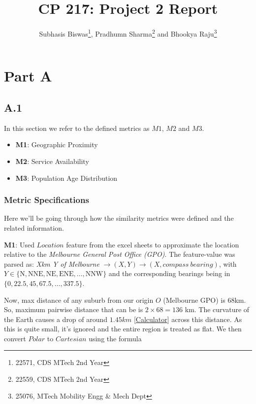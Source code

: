\documentclass[
	a4paper, %
	10pt, %
	unnumberedsections, %
	twoside, %
]{LTJournalArticle}
\title{CP 217: Project 2 Report} %
\author{%
	Subhasis Biswas\thanks{22571, CDS MTech 2nd Year},  Pradhumn Sharma\thanks{22559, CDS MTech 2nd Year} and Bhookya Raju\thanks{25076, MTech Mobility Engg \& Mech Dept}
}
\begin{document}





\section{Part A}



\subsection{A.1}

In this section we refer to the defined metrics as $M1$, $M2$ and $M3$.
\begin{itemize}
    \item \textbf{M1}: Geographic Proximity
    \item \textbf{M2}: Service Availability
    \item \textbf{M3}: Population Age Distribution
\end{itemize}

\subsubsection{Metric Specifications}\leavevmode


Here we'll be going through how the similarity metrics were defined and the related information.

\textbf{M1}: Used $Location$ feature from the excel sheets to approximate the location relative to the \textit{Melbourne General Post Office (GPO)}. The feature-value was parsed as: \newline
\textit{Xkm Y of Melbourne} $\rightarrow (X, Y) \rightarrow (X, compass\ bearing)$, with $Y \in \{\text{N}, \text{NNE}, \text{NE}, \text{ENE}, \dots,\text{NNW}\}$ and the corresponding bearings being in $\{0, 22.5, 45, 67.5,\dots, 337.5\}$.

Now, max distance of any suburb from our origin $O$ (Melbourne GPO) is 68km. So, maximum pairwise distance that can be is $2\times 68=136$ km. The curvature of the Earth causes a drop of around $1.45km$ [\href{https://earthcurvature.com/}{Calculator}] across this distance. As this is quite small, it's ignored and the entire region is treated as flat. We then convert $Polar$ to $Cartesian$ using the formula 
\end{document}
